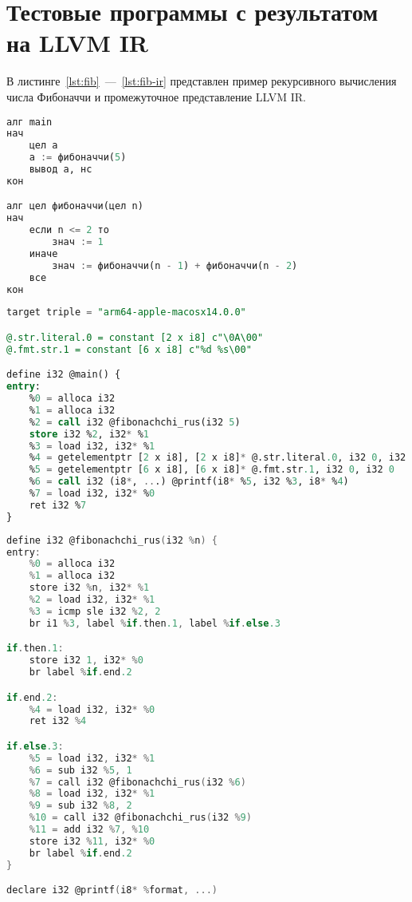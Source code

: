 \section{Тестовые программы с результатом на LLVM IR}
\label{appendix:c}

В листинге~\ref{lst:fib}~---~\ref{lst:fib-ir} представлен пример рекурсивного вычисления числа Фибоначчи и промежуточное представление LLVM IR.

\begin{lstlisting}[language=sql, caption={Пример рекурсивного вычисления числа Фибоначчи}, label=lst:fib]
алг main
нач
    цел a
    a := фибоначчи(5)
    вывод a, нс
кон

алг цел фибоначчи(цел n)
нач
    если n <= 2 то
        знач := 1
    иначе
        знач := фибоначчи(n - 1) + фибоначчи(n - 2)
    все
кон
\end{lstlisting}

\begin{lstlisting}[language=sql, caption={Пример промежуточного представления LLVM IR для рекурсивного вычисления числа Фибоначчи}, label=lst:fib-ir]
target triple = "arm64-apple-macosx14.0.0"

@.str.literal.0 = constant [2 x i8] c"\0A\00"
@.fmt.str.1 = constant [6 x i8] c"%d %s\00"

define i32 @main() {
entry:
	%0 = alloca i32
	%1 = alloca i32
	%2 = call i32 @fibonachchi_rus(i32 5)
	store i32 %2, i32* %1
	%3 = load i32, i32* %1
	%4 = getelementptr [2 x i8], [2 x i8]* @.str.literal.0, i32 0, i32 0
	%5 = getelementptr [6 x i8], [6 x i8]* @.fmt.str.1, i32 0, i32 0
	%6 = call i32 (i8*, ...) @printf(i8* %5, i32 %3, i8* %4)
	%7 = load i32, i32* %0
	ret i32 %7
}
\end{lstlisting}

\newpage
\setcounter{lstlisting}{1}
\begin{lstlisting}[language=go, firstnumber=last, caption={Пример промежуточного представления LLVM IR для рекурсивного вычисления числа Фибоначчи}]
define i32 @fibonachchi_rus(i32 %n) {
entry:
	%0 = alloca i32
	%1 = alloca i32
	store i32 %n, i32* %1
	%2 = load i32, i32* %1
	%3 = icmp sle i32 %2, 2
	br i1 %3, label %if.then.1, label %if.else.3

if.then.1:
	store i32 1, i32* %0
	br label %if.end.2

if.end.2:
	%4 = load i32, i32* %0
	ret i32 %4

if.else.3:
	%5 = load i32, i32* %1
	%6 = sub i32 %5, 1
	%7 = call i32 @fibonachchi_rus(i32 %6)
	%8 = load i32, i32* %1
	%9 = sub i32 %8, 2
	%10 = call i32 @fibonachchi_rus(i32 %9)
	%11 = add i32 %7, %10
	store i32 %11, i32* %0
	br label %if.end.2
}

declare i32 @printf(i8* %format, ...)
\end{lstlisting}

